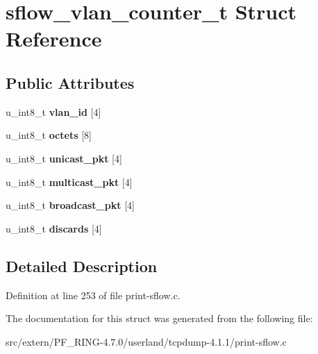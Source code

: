 \hypertarget{structsflow__vlan__counter__t}{
\section{sflow\_\-vlan\_\-counter\_\-t Struct Reference}
\label{structsflow__vlan__counter__t}
}
\subsection*{Public Attributes}
\begin{DoxyCompactItemize}
\item 
\hypertarget{structsflow__vlan__counter__t_a926bf3c9f77eba0e2711831b32d368ac}{
u\_\-int8\_\-t {\bfseries vlan\_\-id} \mbox{[}4\mbox{]}}
\label{structsflow__vlan__counter__t_a926bf3c9f77eba0e2711831b32d368ac}

\item 
\hypertarget{structsflow__vlan__counter__t_a3eb3346a26fd215b087bc42af038e150}{
u\_\-int8\_\-t {\bfseries octets} \mbox{[}8\mbox{]}}
\label{structsflow__vlan__counter__t_a3eb3346a26fd215b087bc42af038e150}

\item 
\hypertarget{structsflow__vlan__counter__t_ad988aa53ec2f9e1dafdb0621bb7b8f51}{
u\_\-int8\_\-t {\bfseries unicast\_\-pkt} \mbox{[}4\mbox{]}}
\label{structsflow__vlan__counter__t_ad988aa53ec2f9e1dafdb0621bb7b8f51}

\item 
\hypertarget{structsflow__vlan__counter__t_a7f3fc81ecfe423a4a60dafb5e684b28e}{
u\_\-int8\_\-t {\bfseries multicast\_\-pkt} \mbox{[}4\mbox{]}}
\label{structsflow__vlan__counter__t_a7f3fc81ecfe423a4a60dafb5e684b28e}

\item 
\hypertarget{structsflow__vlan__counter__t_aa813e215d730c2c4b4bbea94a748c994}{
u\_\-int8\_\-t {\bfseries broadcast\_\-pkt} \mbox{[}4\mbox{]}}
\label{structsflow__vlan__counter__t_aa813e215d730c2c4b4bbea94a748c994}

\item 
\hypertarget{structsflow__vlan__counter__t_aa1c425129c32df4c32eeb644689e36ae}{
u\_\-int8\_\-t {\bfseries discards} \mbox{[}4\mbox{]}}
\label{structsflow__vlan__counter__t_aa1c425129c32df4c32eeb644689e36ae}

\end{DoxyCompactItemize}


\subsection{Detailed Description}


Definition at line 253 of file print-\/sflow.c.



The documentation for this struct was generated from the following file:\begin{DoxyCompactItemize}
\item 
src/extern/PF\_\-RING-\/4.7.0/userland/tcpdump-\/4.1.1/print-\/sflow.c\end{DoxyCompactItemize}
